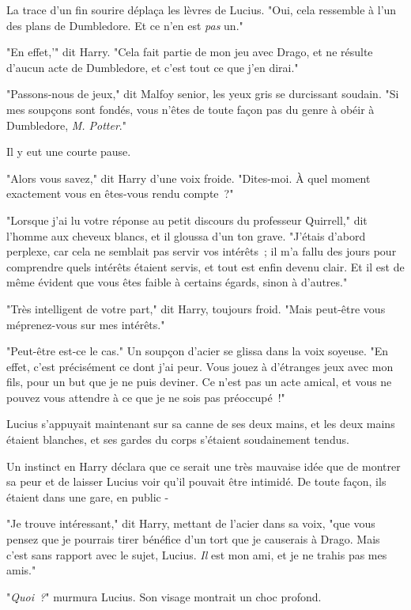 La trace d'un fin sourire déplaça les lèvres de Lucius. "Oui, cela ressemble à l'un des plans de Dumbledore. Et ce n'en est \emph{pas} un."

"En effet,'" dit Harry. "Cela fait partie de mon jeu avec Drago, et ne résulte d'aucun acte de Dumbledore, et c'est tout ce que j'en dirai."

"Passons-nous de jeux," dit Malfoy senior, les yeux gris se durcissant soudain. "Si mes soupçons sont fondés, vous n'êtes de toute façon pas du genre à obéir à Dumbledore, \emph{M. Potter}."

Il y eut une courte pause.

"Alors vous savez," dit Harry d'une voix froide. "Dites-moi. À quel moment exactement vous en êtes-vous rendu compte~?"

"Lorsque j'ai lu votre réponse au petit discours du professeur Quirrell," dit l'homme aux cheveux blancs, et il gloussa d'un ton grave. "J'étais d'abord perplexe, car cela ne semblait pas servir vos intérêts~; il m'a fallu des jours pour comprendre quels intérêts étaient servis, et tout est enfin devenu clair. Et il est de même évident que vous êtes faible à certains égards, sinon à d'autres."

"Très intelligent de votre part," dit Harry, toujours froid. "Mais peut-être vous méprenez-vous sur mes intérêts."

"Peut-être est-ce le cas." Un soupçon d'acier se glissa dans la voix soyeuse. "En effet, c'est précisément ce dont j'ai peur. Vous jouez à d'étranges jeux avec mon fils, pour un but que je ne puis deviner. Ce n'est pas un acte amical, et vous ne pouvez vous attendre à ce que je ne sois pas préoccupé~!"

Lucius s'appuyait maintenant sur sa canne de ses deux mains, et les deux mains étaient blanches, et ses gardes du corps s'étaient soudainement tendus.

Un instinct en Harry déclara que ce serait une très mauvaise idée que de montrer sa peur et de laisser Lucius voir qu'il pouvait être intimidé. De toute façon, ils étaient dans une gare, en public -

"Je trouve intéressant," dit Harry, mettant de l'acier dans sa voix, "que vous pensez que je pourrais tirer bénéfice d'un tort que je causerais à Drago. Mais c'est sans rapport avec le sujet, Lucius. \emph{Il} est mon ami, et je ne trahis pas mes amis."

"\emph{Quoi~?}" murmura Lucius. Son visage montrait un choc profond.

